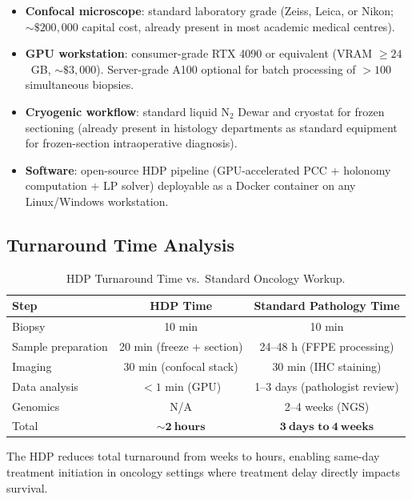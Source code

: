 \begin{itemize}[itemsep=4pt]
    \item \textbf{Confocal microscope}: standard laboratory grade (Zeiss,
          Leica, or Nikon; $\sim \$200{,}000$ capital cost, already present
          in most academic medical centres).
    \item \textbf{GPU workstation}: consumer-grade RTX 4090 or equivalent
          (VRAM $\geq 24$~GB, $\sim \$3{,}000$).  Server-grade A100 optional
          for batch processing of $> 100$ simultaneous biopsies.
    \item \textbf{Cryogenic workflow}: standard liquid N$_2$ Dewar and
          cryostat for frozen sectioning (already present in histology
          departments as standard equipment for frozen-section intraoperative
          diagnosis).
    \item \textbf{Software}: open-source HDP pipeline (GPU-accelerated
          PCC + holonomy computation + LP solver) deployable as a Docker
          container on any Linux/Windows workstation.
\end{itemize}

\subsection{Turnaround Time Analysis}

\begin{table}[ht]
\centering
\caption{HDP Turnaround Time vs.\ Standard Oncology Workup.}
\label{tab:ch04-turnaround}
\begin{tabular}{lcc}
\toprule
Step & HDP Time & Standard Pathology Time \\
\midrule
Biopsy & 10 min & 10 min \\
Sample preparation & 20 min (freeze + section) & 24--48 h (FFPE processing) \\
Imaging & 30 min (confocal stack) & 30 min (IHC staining) \\
Data analysis & $< 1$ min (GPU) & 1--3 days (pathologist review) \\
Genomics & N/A & 2--4 weeks (NGS) \\
Total & $\mathbf{\sim 2\ \text{hours}}$ & $\mathbf{3\ \text{days to}\ 4\ \text{weeks}}$ \\
\bottomrule
\end{tabular}
\end{table}

The HDP reduces total turnaround from weeks to hours, enabling same-day
treatment initiation in oncology settings where treatment delay directly
impacts survival.

